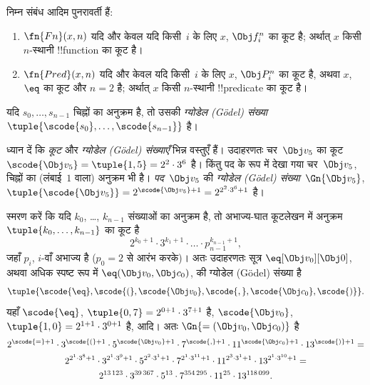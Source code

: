 \documentclass[../../../include/open-logic-section]{subfiles}
\begin{document}
\begin{prop}
निम्न संबंध आदिम पुनरावर्ती हैं:
\begin{enumerate}
\item $\fn{Fn}(x, n)$ यदि और केवल यदि किसी~$i$ के लिए $x$, $\Obj f^n_i$ का
  कूट है; अर्थात् $x$ किसी $n$-स्थानी !!{function} का कूट है।
\item $\fn{Pred}(x, n)$ यदि और केवल यदि किसी~$i$ के लिए $x$, $\Obj P^n_i$
  का कूट है, अथवा $x$, $\eq$ का कूट और $n = 2$ है; अर्थात् $x$ किसी
  $n$-स्थानी !!{predicate} का कूट है।
\end{enumerate}
\end{prop}

\begin{defn}
यदि $s_0, \dots, s_{n-1}$ चिह्नों का अनुक्रम है, तो उसकी \emph{ग्योडेल (G\"odel)
   संख्या} $\tuple{\scode{s_0}, \dots, \scode{s_{n-1}}}$ है।
\end{defn}

\begin{explain}
ध्यान दें कि \emph{कूट} और \emph{ग्योडेल (G\"odel) संख्याएँ} भिन्न वस्तुएँ
हैं। उदाहरणतः चर~$\Obj v_5$ का कूट~$\scode{\Obj v_5} = \tuple{1, 5} =
2^2\cdot 3^6$ है। किंतु पद के रूप में देखा गया चर~$\Obj v_5$, चिह्नों का
(लंबाई~$1$ वाला) अनुक्रम भी है। \emph{पद}~$\Obj v_5$ की \emph{ग्योडेल (G\"odel)
 संख्या}~$\Gn{\Obj v_5}$, $\tuple{\scode{\Obj v_5}} =
2^{\scode{\Obj v_5} + 1} = 2^{2^2\cdot 3^6 + 1}$ है।
\end{explain}

\begin{ex}
स्मरण करें कि यदि $k_0$, \dots, $k_{n-1}$ संख्याओं का अनुक्रम है, तो
अभाज्य-घात कूटलेखन में अनुक्रम $\tuple{k_0, \dots, k_{n-1}}$ का कूट है
\[
2^{k_0+1}\cdot3^{k_1+1}\cdot \dots \cdot p_{n-1}^{k_{n-1}+1},
\]
जहाँ $p_i$, $i$-वाँ अभाज्य है ($p_0 = 2$ से आरंभ करके)। अतः उदाहरणतः सूत्र
$\eq[\Obj v_0][\Obj 0]$, अथवा अधिक स्पष्ट रूप में ${\eq}(\Obj v_0,\Obj
c_0)$, की ग्योडेल (G\"odel) संख्या है
\[
\tuple{\scode{\eq},\scode{(},\scode{\Obj v_0},\scode{,}, \scode{\Obj
    c_0},\scode{)}}.
\]
यहाँ $\scode{\eq}$, $\tuple{0,7} = 2^{0+1}\cdot 3^{7+1}$ है,
$\scode{\Obj v_0}$, $\tuple{1,0} = 2^{1+1}\cdot3^{0+1}$ है, आदि। अतः
$\Gn{=(\Obj v_0,\Obj c_0)}$ है
\begin{multline*}
2^{\scode{=} + 1}\cdot 3^{\scode{(}+1}\cdot 5^{\scode{\Obj v_0}+1}
\cdot 7^{\scode{,} + 1} \cdot 11^{\scode{\Obj c_0}+1} \cdot
13^{\scode{)}+1} = \\
2^{2^1\cdot 3^8 + 1}\cdot 3^{2^1\cdot 3^9+1}\cdot 5^{2^2\cdot 3^1+1}
\cdot 7^{2^1\cdot 3^{11} + 1} \cdot 11^{2^3\cdot3^1+1} \cdot
13^{2^1\cdot3^{10}+1} = \\
2^{13\,123}\cdot 3^{39\,367}\cdot 5^{13}\cdot 7^{354\,295}\cdot11^{25}\cdot13^{118\,099}.
\end{multline*}
\end{ex}
\end{document}
